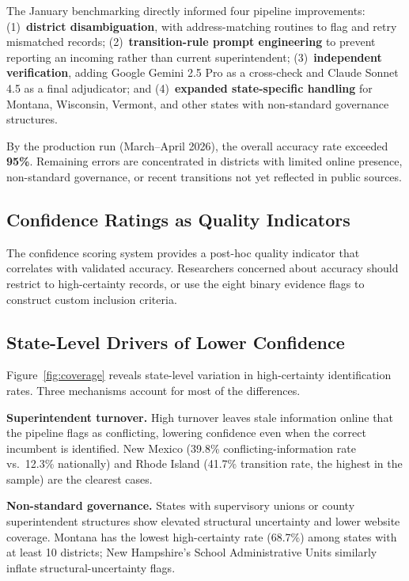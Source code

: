 \documentclass[12pt]{article}
\begin{document}
The January benchmarking directly informed four pipeline improvements: (1)~\textbf{district disambiguation}, with address-matching routines to flag and retry mismatched records; (2)~\textbf{transition-rule prompt engineering} to prevent reporting an incoming rather than current superintendent; (3)~\textbf{independent verification}, adding Google Gemini 2.5 Pro as a cross-check and Claude Sonnet 4.5 as a final adjudicator; and (4)~\textbf{expanded state-specific handling} for Montana, Wisconsin, Vermont, and other states with non-standard governance structures.

By the production run (March--April 2026), the overall accuracy rate exceeded \textbf{95\%}. Remaining errors are concentrated in districts with limited online presence, non-standard governance, or recent transitions not yet reflected in public sources.

\subsection{Confidence Ratings as Quality Indicators}

The confidence scoring system provides a post-hoc quality indicator that correlates with validated accuracy. Researchers concerned about accuracy should restrict to high-certainty records, or use the eight binary evidence flags to construct custom inclusion criteria.

\subsection{State-Level Drivers of Lower Confidence}

Figure~\ref{fig:coverage} reveals state-level variation in high-certainty identification rates. Three mechanisms account for most of the differences.

\textbf{Superintendent turnover.} High turnover leaves stale information online that the pipeline flags as conflicting, lowering confidence even when the correct incumbent is identified. New Mexico (39.8\% conflicting-information rate vs.\ 12.3\% nationally) and Rhode Island (41.7\% transition rate, the highest in the sample) are the clearest cases.

\textbf{Non-standard governance.} States with supervisory unions or county superintendent structures show elevated structural uncertainty and lower website coverage. Montana has the lowest high-certainty rate (68.7\%) among states with at least 10 districts; New Hampshire's School Administrative Units similarly inflate structural-uncertainty flags.
\end{document}
